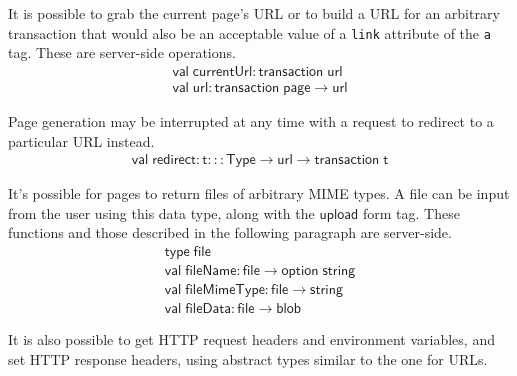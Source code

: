 \documentclass{article}
\newcommand{\mt}[1]{\mathsf{#1}}
\begin{document}
It is possible to grab the current page's URL or to build a URL for an arbitrary transaction that would also be an acceptable value of a \texttt{link} attribute of the \texttt{a} tag.  These are server-side operations.
$$\begin{array}{l}
  \mt{val} \; \mt{currentUrl} : \mt{transaction} \; \mt{url} \\
  \mt{val} \; \mt{url} : \mt{transaction} \; \mt{page} \to \mt{url}
\end{array}$$

Page generation may be interrupted at any time with a request to redirect to a particular URL instead.
$$\begin{array}{l}
  \mt{val} \; \mt{redirect} : \mt{t} ::: \mt{Type} \to \mt{url} \to \mt{transaction} \; \mt{t}
\end{array}$$

It's possible for pages to return files of arbitrary MIME types.  A file can be input from the user using this data type, along with the $\mt{upload}$ form tag.  These functions and those described in the following paragraph are server-side.
$$\begin{array}{l}
  \mt{type} \; \mt{file} \\
  \mt{val} \; \mt{fileName} : \mt{file} \to \mt{option} \; \mt{string} \\
  \mt{val} \; \mt{fileMimeType} : \mt{file} \to \mt{string} \\
  \mt{val} \; \mt{fileData} : \mt{file} \to \mt{blob}
\end{array}$$

It is also possible to get HTTP request headers and environment variables, and set HTTP response headers, using abstract types similar to the one for URLs.
\end{document}

